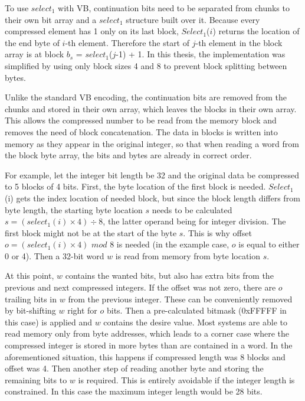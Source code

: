 To use $select_1$ with VB, continuation bits need to be separated from chunks to their own bit array and a $select_1$ structure built over it. Because every compressed element has 1
only on its last block, $Select_1$($i$) returns the location of the end byte of $i$-th element. Therefore the start of  $j$-th element in the block array is at 
block $b_s$ = $select_1$($j$-1) + 1. In this thesis, the implementation was simplified by using only block sizes 4 and 8 to prevent block splitting between bytes.

Unlike the standard VB encoding, the continuation bits are removed from the chunks and stored in their own array, which leaves the blocks in their own array. This allows the 
compressed number to be read from the memory block and removes the need of block concatenation. The data in blocks is written into memory as they appear in the original integer, so that 
when reading a word from the block byte array, the bits and bytes are already in correct order. 

For example, let the integer bit length be 32 and the original data be compressed to 5 blocks of 4 bits. First, the byte location of the first block is needed. $Select_1$(i) gets the index location
of needed block, but since the block length differs from byte length, the starting byte location $s$ needs to be calculated $s = (select_1(i) \times 4) \div 8$, the latter operand being for integer division.
The first block might not be at the start of the byte $s$. This is why offset $o = (select_1(i) \times 4)$ $mod$ $8$ is needed (in the example case, $o$ is equal to either 0 or 4). Then a 32-bit word $w$ is read from memory from byte location $s$. 

At this point, $w$ contains the wanted bits, but also has extra bits from the previous and next compressed integers. If the offset was not zero, there are $o$ trailing bits in $w$ from the previous integer. 
These can be conveniently removed by bit-shifting $w$ right for $o$ bits. Then a pre-calculated bitmask (0xFFFFF in this case) is applied and $w$ contains the desire value. Most systems are
able to read memory only from byte addresses, which leads to a corner case where the compressed integer is stored in more bytes than are contained in a word. In the aforementioned situation, this 
happens if compressed length was 8 blocks and offset was 4. Then another step of reading another byte and storing the remaining bits to $w$ is required. This is entirely avoidable if the integer 
length is constrained. In this case the maximum integer length would be 28 bits.

